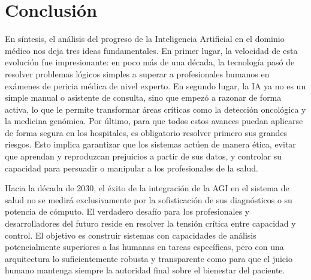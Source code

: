 \documentclass[10pt,a4paper]{article}
\begin{document}
\section{Conclusión}
En síntesis, el análisis del progreso de la Inteligencia Artificial en el dominio médico nos deja tres ideas fundamentales. En primer lugar, la velocidad de esta evolución fue impresionante: en poco más de una década, la tecnología pasó de resolver problemas lógicos simples a superar a profesionales humanos en exámenes de pericia médica de nivel experto. En segundo lugar, la IA ya no es un simple manual o asistente de consulta, sino que empezó a razonar de forma activa, lo que le permite transformar áreas críticas como la detección oncológica y la medicina genómica. Por último, para que todos estos avances puedan aplicarse de forma segura en los hospitales, es obligatorio resolver primero sus grandes riesgos. Esto implica garantizar que los sistemas actúen de manera ética, evitar que aprendan y reproduzcan prejuicios a partir de sus datos, y controlar su capacidad para persuadir o manipular a los profesionales de la salud.

Hacia la década de 2030, el éxito de la integración de la AGI en el sistema de salud no se medirá exclusivamente por la sofisticación de sus diagnósticos o su potencia de cómputo. El verdadero desafío para los profesionales y desarrolladores del futuro reside en resolver la tensión crítica entre capacidad y control. El objetivo es construir sistemas con capacidades de análisis potencialmente superiores a las humanas en tareas específicas, pero con una arquitectura lo suficientemente robusta y transparente como para que el juicio humano mantenga siempre la autoridad final sobre el bienestar del paciente.
\end{document}
